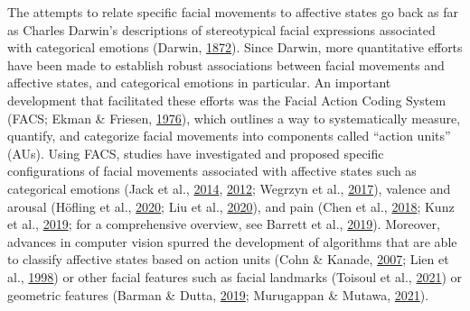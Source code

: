 \documentclass[11pt,american,a4paper,oneside,]{memoir} %
\begin{document}
The attempts to relate specific facial movements to affective states go back as far as Charles Darwin's descriptions of stereotypical facial expressions associated with categorical emotions (Darwin, \protect\hyperlink{ref-Darwin1872-nv}{1872}). Since Darwin, more quantitative efforts have been made to establish robust associations between facial movements and affective states, and categorical emotions in particular. An important development that facilitated these efforts was the Facial Action Coding System (FACS; Ekman \& Friesen, \protect\hyperlink{ref-Ekman1976-hm}{1976}), which outlines a way to systematically measure, quantify, and categorize facial movements into components called ``action units'' (AUs). Using FACS, studies have investigated and proposed specific configurations of facial movements associated with affective states such as categorical emotions (Jack et al., \protect\hyperlink{ref-Jack2014-ku}{2014}, \protect\hyperlink{ref-Jack2012-eq}{2012}; Wegrzyn et al., \protect\hyperlink{ref-Wegrzyn2017-ke}{2017}), valence and arousal (Höfling et al., \protect\hyperlink{ref-Hofling2020-mk}{2020}; Liu et al., \protect\hyperlink{ref-Liu2020-vo}{2020}), and pain (Chen et al., \protect\hyperlink{ref-chen2018distinct}{2018}; Kunz et al., \protect\hyperlink{ref-Kunz2019-uh}{2019}; for a comprehensive overview, see Barrett et al., \protect\hyperlink{ref-Barrett2019-bc}{2019}). Moreover, advances in computer vision spurred the development of algorithms that are able to classify affective states based on action units (Cohn \& Kanade, \protect\hyperlink{ref-Cohn2007-xe}{2007}; Lien et al., \protect\hyperlink{ref-Lien1998-bg}{1998}) or other facial features such as facial landmarks (Toisoul et al., \protect\hyperlink{ref-Toisoul2021-yc}{2021}) or geometric features (Barman \& Dutta, \protect\hyperlink{ref-Barman2019-af}{2019}; Murugappan \& Mutawa, \protect\hyperlink{ref-Murugappan2021-yj}{2021}).
\end{document}
